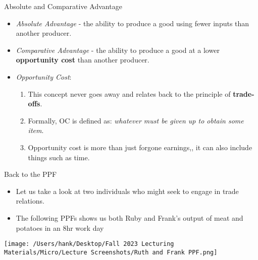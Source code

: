 \documentclass{beamer}
\begin{document}
\begin{frame}{Absolute and Comparative Advantage}
    \begin{itemize}
        \item \textit{Absolute Advantage} - the ability to produce a good using fewer inputs than another producer.
        \vspace{5mm}
        \item \textit{Comparative Advantage} - the ability to produce a good at a lower \textbf{opportunity cost} than another producer.
        
        \vspace{5mm}
        \item \textit{Opportunity Cost}:
            \begin{enumerate}
                \item This concept never goes away and relates back to the principle of \textbf{trade-offs}.
                \item Formally, OC is defined as: \textit{whatever must be given up to obtain some item}.
                \item Opportunity cost is more than just forgone earnings,, it can also include things such as time.
            \end{enumerate}
    \end{itemize}
    
\end{frame}

\begin{frame}{Back to the PPF}
    \begin{itemize}
        \item Let us take a look at two individuals who might seek to engage in trade relations.
        \item The following PPFs shows us both Ruby and Frank's output of meat and potatoes in an 8hr work day
    \end{itemize}
    \texttt{[image: /Users/hank/Desktop/Fall 2023 Lecturing Materials/Micro/Lecture Screenshots/Ruth and Frank PPF.png]}
\end{frame}
\end{document}
